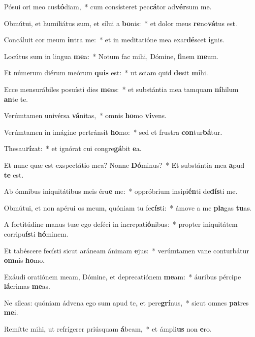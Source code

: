 \item Pósui ori meo cus\textbf{tó}diam,~* cum consísteret pec\textbf{cá}tor ad\textbf{vér}sum me.
\item Obmútui, et humiliátus sum, et sílui a \textbf{bo}nis:~* et dolor meus \textbf{re}no\textbf{vá}tus est.
\item Concáluit cor meum \textbf{in}tra me:~* et in meditatióne mea exar\textbf{dé}scet \textbf{i}gnis.
\item Locútus sum in lingua \textbf{me}a:~* Notum fac mihi, Dómine, \textbf{fi}nem \textbf{me}um.
\item Et númerum diérum meórum \textbf{quis} est:~* ut sciam quid \textbf{de}sit \textbf{mi}hi.
\item Ecce mensurábiles posuísti dies \textbf{me}os:~* et substántia mea tamquam \textbf{ní}hilum \textbf{an}te te.
\item Verúmtamen univérsa \textbf{vá}nitas,~* omnis \textbf{ho}mo \textbf{vi}vens.
\item Verúmtamen in imágine pertránsit \textbf{ho}mo:~* sed et frustra \textbf{con}tur\textbf{bá}tur.
\item Thesau\textbf{rí}zat:~* et ignórat cui congre\textbf{gá}bit \textbf{e}a.
\item Et nunc quæ est exspectátio mea? Nonne \textbf{Dó}minus?~* Et substántia mea \textbf{a}pud \textbf{te} est.
\item Ab ómnibus iniquitátibus meis éru\textbf{e} me:~* oppróbrium insipi\textbf{én}ti de\textbf{dís}ti me.
\item Obmútui, et non apérui os meum, quóniam tu fe\textbf{cís}ti:~* ámove a me \textbf{pla}gas \textbf{tu}as.
\item A fortitúdine manus tuæ ego deféci in increpati\textbf{ó}nibus:~* propter iniquitátem corripu\textbf{ís}ti \textbf{hó}minem.
\item Et tabéscere fecísti sicut aráneam ánimam \textbf{e}jus:~* verúmtamen vane conturbátur \textbf{om}nis \textbf{ho}mo.
\item Exáudi oratiónem meam, Dómine, et deprecatiónem \textbf{me}am:~* áuribus pércipe \textbf{lá}crimas \textbf{me}as.
\item Ne síleas: quóniam ádvena ego sum apud te, et pere\textbf{grí}nus,~* sicut omnes \textbf{pa}tres \textbf{me}i.
\item Remítte mihi, ut refrígerer priúsquam \textbf{á}beam,~* et ámpli\textbf{us} non \textbf{e}ro.
